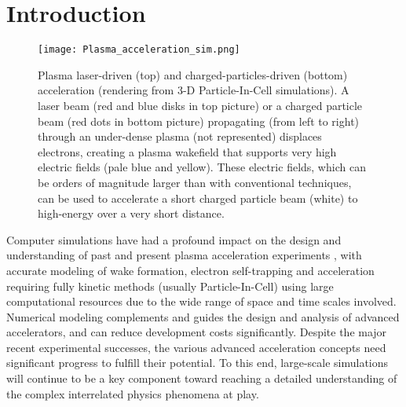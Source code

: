 %
%


\section{Introduction}

\begin{figure}
\texttt{[image: Plasma\_acceleration\_sim.png]}

\caption{\label{fig:Plasma_acceleration_sim} Plasma laser-driven (top) and charged-particles-driven (bottom) acceleration (rendering from 3-D Particle-In-Cell simulations). A laser beam (red and blue disks in top picture) or a charged particle beam (red dots in bottom picture) propagating (from left to right) through an under-dense plasma (not represented) displaces electrons, creating a plasma wakefield that supports very high electric fields (pale blue and yellow). These electric fields, which can be orders of magnitude larger than with conventional techniques, can be used to accelerate a short charged particle beam (white) to high-energy over a very short distance.}
\end{figure}

Computer simulations have had a profound impact on the design and understanding of past and present plasma acceleration experiments \cite{Tsungpop06,Geddesjp08,Geddesscidac09,Huangscidac09}, with
accurate modeling of wake formation, electron self-trapping and acceleration requiring fully kinetic methods (usually Particle-In-Cell) using large computational resources due to the wide range of space and time scales involved. Numerical modeling complements and guides the design and analysis of advanced accelerators, and can reduce development costs significantly. Despite the major recent experimental successes\cite{LeemansPRL2014,Blumenfeld2007,BulanovSV2014,Steinke2016}, the various advanced acceleration concepts need significant progress to fulfill their potential.  To this end, large-scale simulations will continue to be a key component toward reaching a detailed understanding of the complex interrelated physics phenomena at play.

